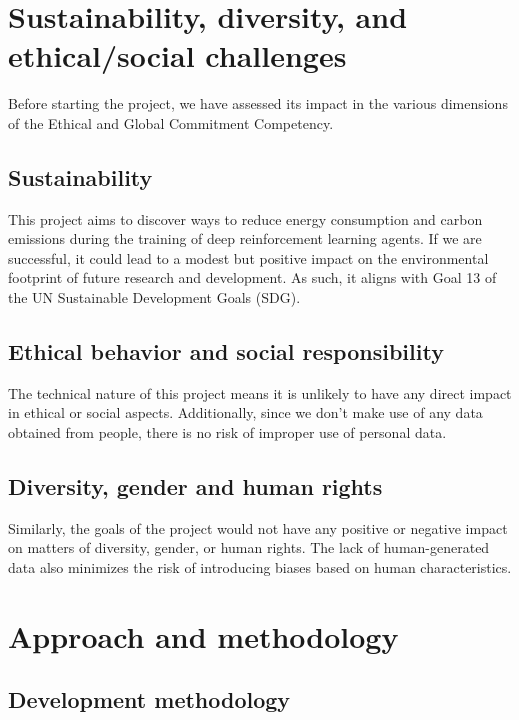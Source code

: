 \section{Sustainability, diversity, and ethical/social challenges}

Before starting the project, we have assessed its impact in the various dimensions of the Ethical and Global Commitment Competency.

\subsection{Sustainability}

This project aims to discover ways to reduce energy consumption and carbon emissions during the training of deep reinforcement learning agents. If we are successful, it could lead to a modest but positive impact on the environmental footprint of future research and development. As such, it aligns with Goal 13 \cite{UN:Goal13} of the UN Sustainable Development Goals (SDG).

\subsection{Ethical behavior and social responsibility}

The technical nature of this project means it is unlikely to have any direct impact in ethical or social aspects. Additionally, since we don't make use of any data obtained from people, there is no risk of improper use of personal data.

\subsection{Diversity, gender and human rights}

Similarly, the goals of the project would not have any positive or negative impact on matters of diversity, gender, or human rights. The lack of human-generated data also minimizes the risk of introducing biases based on human characteristics.

\section{Approach and methodology}

\subsection{Development methodology}

